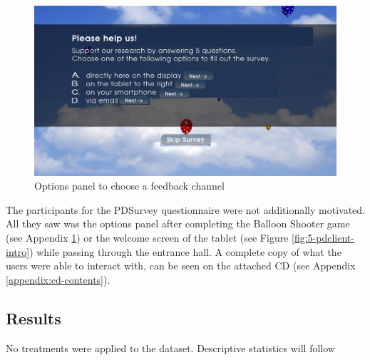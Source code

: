 		\begin{figure}
		    \begin{center}
				\includegraphics[width=.8\columnwidth]{img/screenshots/options-overview.jpg}
		    \end{center}
		 \caption{Options panel to choose a feedback channel}
		 \label{fig:5-feedback-options}
		\end{figure}


		The participants for the PDSurvey questionnaire were not additionally motivated. All they saw was the options panel after completing the Balloon Shooter game (see Appendix \ref{fig:5-feedback-options}) or the welcome screen of the tablet (see Figure \ref{fig:5-pdclient-intro}) while passing through the entrance hall. A complete copy of what the users were able to interact with, can be seen on the attached CD (see Appendix \ref{appendix:cd-contents}).





\subsection{Results}






No treatments were applied to the dataset. Descriptive statistics will follow



